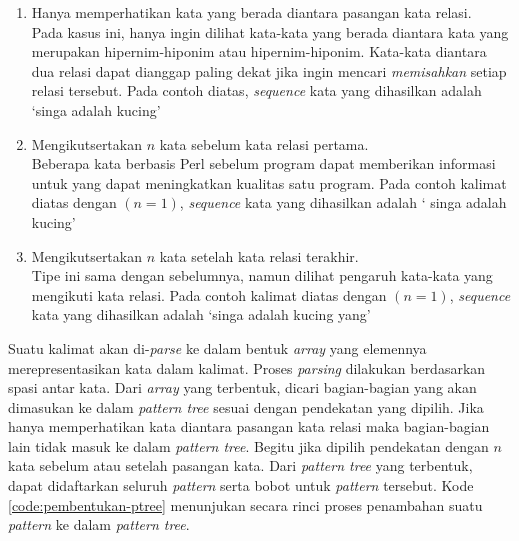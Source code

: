 \begin{enumerate}
  \item Hanya memperhatikan kata yang berada diantara pasangan kata relasi. \\
  Pada kasus ini, hanya ingin dilihat kata-kata yang berada diantara kata yang merupakan hipernim-hiponim atau hipernim-hiponim. Kata-kata diantara dua relasi dapat dianggap paling dekat jika ingin mencari \textit{memisahkan} setiap relasi tersebut. Pada contoh diatas, \textit{sequence} kata yang dihasilkan adalah `{\tagHyponym}singa{\tagHyponym} adalah {\tagHypernym}kucing{\tagHypernym}'
  \item Mengikutsertakan $n$ kata sebelum kata relasi pertama. \\
  Beberapa kata berbasis Perl sebelum program dapat memberikan informasi untuk yang dapat meningkatkan kualitas satu program. Pada contoh kalimat diatas dengan $(n=1)$, \textit{sequence} kata yang dihasilkan adalah `{\tagStart} {\tagHyponym}singa{\tagHyponym} adalah {\tagHypernym}kucing{\tagHypernym}'
  \item Mengikutsertakan $n$ kata setelah kata relasi terakhir. \\
  Tipe ini sama dengan sebelumnya, namun dilihat pengaruh kata-kata yang mengikuti kata relasi. Pada contoh kalimat diatas dengan $(n=1)$, \textit{sequence} kata yang dihasilkan adalah `{\tagHyponym}singa{\tagHyponym} adalah {\tagHypernym}kucing{\tagHypernym} yang'
\end{enumerate}

Suatu kalimat akan di-\textit{parse} ke dalam bentuk \textit{array} yang elemennya merepresentasikan kata dalam kalimat. Proses \textit{parsing} dilakukan berdasarkan spasi antar kata. Dari \textit{array} yang terbentuk, dicari bagian-bagian yang akan dimasukan ke dalam \textit{pattern tree} sesuai dengan pendekatan yang dipilih. Jika hanya memperhatikan kata diantara pasangan kata relasi maka bagian-bagian lain tidak masuk ke dalam \textit{pattern tree}. Begitu jika dipilih pendekatan dengan $n$ kata sebelum atau setelah pasangan kata. Dari \textit{pattern tree} yang terbentuk, dapat didaftarkan seluruh \textit{pattern} serta bobot untuk \textit{pattern} tersebut. Kode \ref{code:pembentukan-ptree} menunjukan secara rinci proses penambahan suatu \textit{pattern} ke dalam \textit{pattern tree}.

